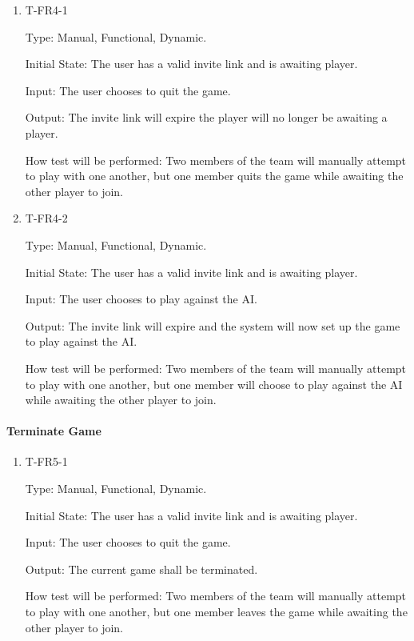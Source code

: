 \documentclass[12pt, titlepage]{article}
\begin{document}
        \begin{enumerate}

        \item{T-FR4-1\\}

            Type: Manual, Functional, Dynamic.
            					
            Initial State: The user has a valid invite link and is awaiting player.
            					
            Input: The user chooses to quit the game.
            					
            Output: The invite link will expire the player will no longer be awaiting a player.
            					
            How test will be performed: Two members of the team will manually attempt to play with one another, but one member quits the game while awaiting the other player to join. 
        
        \item{T-FR4-2\\}
            
            Type: Manual, Functional, Dynamic.
            					
            Initial State: The user has a valid invite link and is awaiting player.
            					
            Input: The user chooses to play against the AI.
            					
            Output: The invite link will expire and the system will now set up the game to play against the AI.
            					
            How test will be performed: Two members of the team will manually attempt to play with one another, but one member will choose to play against the AI while awaiting the other player to join. 
        
        \end{enumerate}

    \paragraph{Terminate Game}
    
        \begin{enumerate}
        
        \item{T-FR5-1\\}
        
            Type: Manual, Functional, Dynamic.
            					
            Initial State: The user has a valid invite link and is awaiting player.
            					
            Input: The user chooses to quit the game.
            					
            Output: The current game shall be terminated.
            					
            How test will be performed: Two members of the team will manually attempt to play with one another, but one member leaves the game while awaiting the other player to join. 
        
        \end{enumerate}
\end{document}
